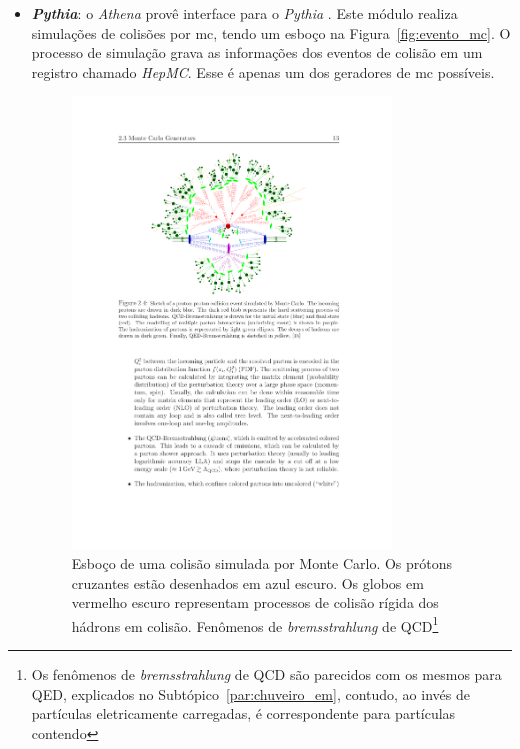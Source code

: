 \begin{itemize}
\item \textbf{\emph{Pythia}}: o \emph{Athena} provê interface para o
\emph{Pythia} \cite{pythia}. Este módulo
realiza simulações de colisões por \gls{mc}, tendo um esboço na
Figura~\ref{fig:evento_mc}. O processo de simulação grava as
informações dos eventos de colisão em um registro chamado \emph{HepMC}. Esse é
apenas um dos geradores de \gls{mc} possíveis.
\begin{figure}[b!]
\centering
\includegraphics[width=0.8\textwidth]{imagens/evento_mc.pdf}
\begin{minipage}{\textwidth}
\setcounter{mpfootnote}{\value{footnote}}
\renewcommand{\thempfootnote}{\arabic{mpfootnote}}
\caption[Esboço de uma colisão simulada por Monte Carlo]{
Esboço de uma colisão simulada por Monte Carlo. Os prótons cruzantes estão
desenhados em azul escuro. Os globos em vermelho escuro representam processos de
colisão rígida dos hádrons em colisão. Fenômenos de \emph{bremsstrahlung} de
QCD{\footnote{Os fenômenos de \emph{bremsstrahlung} de QCD são parecidos 
com os mesmos para QED, explicados no Subtópico~{\ref{par:chuveiro_em}}, contudo, ao invés
de partículas eletricamente carregadas, é correspondente para partículas contendo
}}}
\end{minipage}
\end{figure}
\end{itemize}
